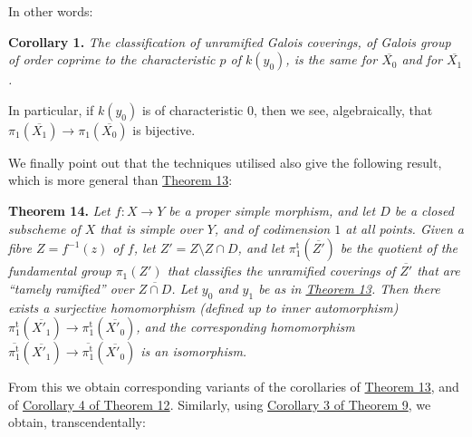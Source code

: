 \documentclass{article}
\newenvironment{itenv}[1]
  {\phantomsection\par\smallskip\noindent\textbf{#1.}\itshape}
  {\par\smallskip}
\theoremstyle{definition}
\theoremstyle{definition}
\theoremstyle{definition}
\theoremstyle{definition}
\theoremstyle{remark}
\begin{document}
In other words:

\leavevmode{}%
\begin{itenv}{Corollary 1}
The classification of unramified Galois coverings, of Galois group of order coprime to the characteristic \(p\) of \(k(y_0)\), is the same for \(\overline{X_0}\) and for \(\overline{X_1}\).

\end{itenv}

In particular, if \(k(y_0)\) is of characteristic \(0\), then we see, algebraically, that \(\pi_1(\overline{X_1})\to\pi_1(\overline{X_0})\) is bijective.

We finally point out that the techniques utilised also give the following result, which is more general than \protect\hyperlink{fga-2-theorem-13}{Theorem 13}:

\leavevmode{}%
\begin{itenv}{Theorem 14}
Let \(f\colon X\to Y\) be a proper simple morphism, and let \(D\) be a closed subscheme of \(X\) that is simple over \(Y\), and of codimension \(1\) at all points.
Given a fibre \(Z=f^{-1}(z)\) of \(f\), let \(Z'=Z\setminus Z\cap D\), and let \(\pi_1^\mathrm{t}(\overline{Z'})\) be the quotient of the fundamental group \(\pi_1(Z')\) that classifies the unramified coverings of \(\overline{Z'}\) that are ``tamely ramified'' over \(\overline{Z\cap D}\).
Let \(y_0\) and \(y_1\) be as in \protect\hyperlink{fga-2-theorem-13}{Theorem 13}.
Then there exists a \emph{surjective} homomorphism (defined up to inner automorphism) \(\pi_1^\mathrm{t}(\overline{X'_1})\to\pi_1^\mathrm{t}(\overline{X'_0})\), and the corresponding homomorphism \(\overline{\pi_1^\mathrm{t}}(\overline{X'_1})\to\overline{\pi_1^\mathrm{t}}(\overline{X'_0})\) is an isomorphism.

\end{itenv}

From this we obtain corresponding variants of the corollaries of \protect\hyperlink{fga-2-theorem-13}{Theorem 13}, and of \protect\hyperlink{fga-2-theorem-12-corollary-4}{Corollary 4 of Theorem 12}.
Similarly, using \protect\hyperlink{fga-2-theorem-9-corollary-3}{Corollary 3 of Theorem 9}, we obtain, transcendentally:
\end{document}
